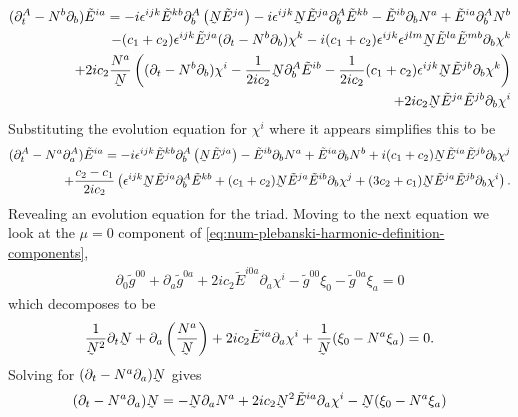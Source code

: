 \documentclass[10pt]{report}
\newcommand{\utilde}[1]{\underaccent{\tilde}{#1}}
\theoremstyle{definition}
\newcommand{\tE}[0]{\tilde{E}}
\newcommand{\tg}[0]{\tilde{g}}
\newcommand{\dlap}[0]{\utilde{N}}
\begin{document}
    \begin{align}
        (\partial_t^A - N^b \partial_b) \tE^{ia} = -i \epsilon^{ijk} \tE^{kb} \partial^A_b \left( \dlap \tE^{ja} \right) -i \epsilon^{ijk} \dlap \tE^{ja} \partial^A_b \tE^{kb} - \tE^{ib} \partial_b N^a + \tE^{ia} \partial^A_b N^b \nonumber\\ - (c_1 + c_2) \epsilon^{ijk} \tE^{ja} (\partial_t - N^b \partial_b) \chi^k  - i (c_1 + c_2) \epsilon^{ijk} \epsilon^{jlm} \dlap \tE^{la} \tE^{mb} \partial_b \chi^k  \nonumber \\ + 2i c_2 \frac{N^a}{\dlap} \left( (\partial_t - N^b \partial_b) \chi^i - \frac{1}{2 i c_2} \dlap \partial^A_b \tE^{ib} - \frac{1}{2 i c_2} (c_1+c_2) \epsilon^{ijk} \dlap \tE^{jb} \partial_b \chi^k \right) \nonumber\\ + 2ic_2 \dlap \tE^{ja} \tE^{jb} \partial_b \chi^i
    \end{align}
    Substituting the evolution equation for $\chi^i$ where it appears simplifies this to be
    \begin{align}
        (\partial^A_t - N^a \partial^A_a) \tE^{ia} = -i \epsilon^{ijk} \tE^{kb} \partial_b^A \left(\dlap \tE^{ja}\right) - \tE^{ib} \partial_b N^a + \tE^{ia} \partial_b N^b + i(c_1 + c_2) \dlap \tE^{ia} \tE^{jb} \partial_b \chi^j \nonumber\\ + \frac{c_2-c_1}{2 i c_2}\left( \epsilon^{ijk} \dlap \tE^{ja} \partial_b^A \tE^{kb} + (c_1+c_2) \dlap \tE^{ja} \tE^{ib} \partial_b \chi^j + (3c_2 + c_1) \dlap \tE^{ja} \tE^{jb} \partial_b \chi^i \right).
    \end{align}
    Revealing an evolution equation for the triad. Moving to the next equation we look at the $\mu = 0$ component of \cref{eq:num-plebanski-harmonic-definition-components},
    \begin{align}
        \partial_0 \tg^{00} + \partial_a \tg^{0a} + 2i c_2 \tE^{i0a} \partial_a \chi^i - \tg^{00} \xi_0 - \tg^{0a} \xi_a = 0
    \end{align}
    which decomposes to be
    \begin{align}
        \frac{1}{\dlap^2} \partial_t \dlap + \partial_a \left( \frac{N^a}{\dlap} \right) + 2i c_2 \tE^{ia} \partial_a \chi^i + \frac{1}{\dlap} ( \xi_0 - N^a \xi_a) = 0.
    \end{align}
    Solving for $(\partial_t - N^a \partial_a) \dlap$ gives
    \begin{align}
        (\partial_t - N^a \partial_a)\dlap = - \dlap \partial_a N^a + 2ic_2 \dlap^2 \tE^{ia} \partial_a \chi^i - \dlap ( \xi_0 - N^a \xi_a)
    \end{align}
\end{document}
